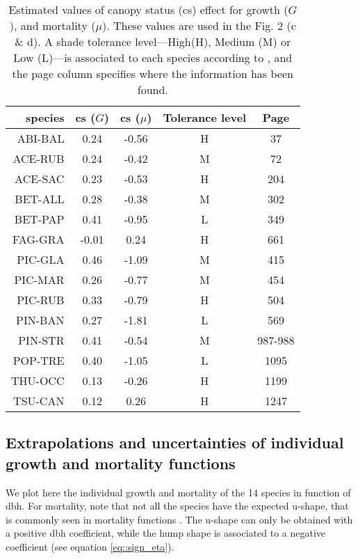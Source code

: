 \documentclass[letterpaper, 12pt]{article}
\theoremstyle{theo}
\begin{document}
\begin{refsection}
\begin{onehalfspace}
\begin{table}[h!]
\centering
\caption[Canopy status effect]{Estimated values of canopy status (cs) effect for growth ($ G $), and mortality ($ \mu $). These values are used in the Fig. 2 (c \& d). A shade tolerance level---High(H), Medium (M) or Low (L)---is associated to each species according to \citet{Burns1990, Burns1990a}, and the page column specifies where the information has been found. \label{tab::cs}}
\begin{tabular}{@{}rcccc@{}}
	\toprule
	\bfseries{species} & \bfseries{cs} ($ G $) & \bfseries{cs} ($ \mu $) & \bfseries{Tolerance level} & \bfseries{Page} \\
	\midrule
	ABI-BAL & 0.24 & -0.56 & H & 37 \\
	ACE-RUB & 0.24 & -0.42 & M & 72 \\
	ACE-SAC & 0.23 & -0.53 & H & 204 \\
	BET-ALL & 0.28 & -0.38 & M & 302 \\
	BET-PAP & 0.41 & -0.95 & L & 349 \\
	FAG-GRA & -0.01 & 0.24 & H & 661 \\
	PIC-GLA & 0.46 & -1.09 & M & 415 \\
	PIC-MAR & 0.26 & -0.77 & M & 454 \\
	PIC-RUB & 0.33 & -0.79 & H & 504 \\
	PIN-BAN & 0.27 & -1.81 & L & 569 \\
	PIN-STR & 0.41 & -0.54 & M & 987-988 \\
	POP-TRE & 0.40 & -1.05 & L & 1095 \\
	THU-OCC & 0.13 & -0.26 & H & 1199 \\
	TSU-CAN & 0.12 & 0.26 & H & 1247 \\
	\bottomrule
\end{tabular}
\end{table}

\subsection{Extrapolations and uncertainties of individual growth and mortality functions}
We plot here the individual growth and mortality of the 14 species in function of dbh. For mortality, note that not all the species have the expected u-shape, that is commonly seen in mortality functions \citep{Lines2010}. The u-shape can only be obtained with a positive dbh coefficient, while the hump shape is associated to a negative coefficient (see equation \eqref{eq::sign_eta}).


\end{onehalfspace}
\end{refsection}
\end{document}
